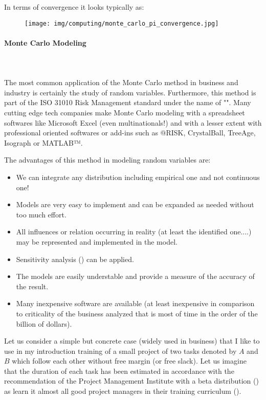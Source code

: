 	
	
	In terms of convergence it looks typically as:
	\begin{figure}[H]
		\centering
		\texttt{[image: img/computing/monte\_carlo\_pi\_convergence.jpg]}
	\end{figure}
	
	\paragraph{Monte Carlo Modeling}\mbox{}\\\\
	The most common application of the Monte Carlo method in business and industry is certainly the study of random variables. Furthermore, this method is part of the ISO 31010 Risk Management standard under the name of "". Many cutting edge tech companies make Monte Carlo modeling with a spreadsheet softwares like Microsoft Excel (even multinationals!) and with a lesser extent with professional oriented softwares or add-ins such as @RISK, CrystalBall, TreeAge, Isograph or MATLAB™.
	
	The advantages of this method in modeling random variables are:
	\begin{itemize}
		\item We can integrate any distribution  including empirical one and not continuous one!

		\item Models are very easy to implement and can be expanded as needed without too much effort.

		\item All influences or relation occurring in reality (at least the identified one....) may be represented and implemented in the model.

		\item Sensitivity analysis () can be applied.

		\item The models are easily understable and provide a measure of the accuracy of the result.

		\item Many inexpensive software are available (at least inexpensive in comparison to criticality of the business analyzed that is most of time in the order of the billion of dollars).
	\end{itemize}
	Let us consider a simple but concrete case (widely used in business) that I like to use in my introduction training of a small project of two tasks denoted by $A$ and $B$ which follow each other without free margin (or free slack). Let us imagine that the duration of each task has been estimated in accordance with the recommendation of the Project Management Institute with a beta distribution () as learn it almost all good project managers in their training curriculum ().

